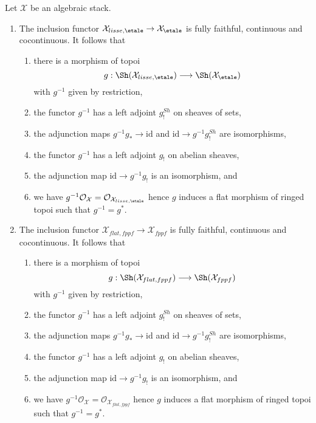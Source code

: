 \begin{lemma}
\label{lemma-lisse-etale}
Let $\mathcal{X}$ be an algebraic stack.
\begin{enumerate}
\item The inclusion functor
$\mathcal{X}_{lisse,\etale} \to \mathcal{X}_\etale$
is fully faithful, continuous and cocontinuous. It follows that
\begin{enumerate}
\item there is a morphism of topoi
$$
g :
\Sh(\mathcal{X}_{lisse,\etale})
\longrightarrow
\Sh(\mathcal{X}_\etale)
$$
with $g^{-1}$ given by restriction,
\item the functor $g^{-1}$ has a left adjoint $g_!^{Sh}$ on sheaves of sets,
\item the adjunction maps $g^{-1}g_* \to \text{id}$ and
$\text{id} \to g^{-1}g_!^{Sh}$ are isomorphisms,
\item the functor $g^{-1}$ has a left adjoint $g_!$ on abelian sheaves,
\item the adjunction map $\text{id} \to g^{-1}g_!$ is an isomorphism, and
\item we have $g^{-1}\mathcal{O}_\mathcal{X} =
\mathcal{O}_{\mathcal{X}_{lisse,\etale}}$ hence $g$ induces a flat
morphism of ringed topoi such that $g^{-1} = g^*$.
\end{enumerate}
\item The inclusion functor
$\mathcal{X}_{flat,fppf} \to \mathcal{X}_{fppf}$
is fully faithful, continuous and cocontinuous. It follows that
\begin{enumerate}
\item there is a morphism of topoi
$$
g :
\Sh(\mathcal{X}_{flat,fppf})
\longrightarrow
\Sh(\mathcal{X}_{fppf})
$$
with $g^{-1}$ given by restriction,
\item the functor $g^{-1}$ has a left adjoint $g_!^{Sh}$ on sheaves of sets,
\item the adjunction maps $g^{-1}g_* \to \text{id}$ and
$\text{id} \to g^{-1}g_!^{Sh}$ are isomorphisms,
\item the functor $g^{-1}$ has a left adjoint $g_!$ on abelian sheaves,
\item the adjunction map $\text{id} \to g^{-1}g_!$ is an isomorphism, and
\item we have $g^{-1}\mathcal{O}_\mathcal{X} =
\mathcal{O}_{\mathcal{X}_{flat,fppf}}$ hence $g$ induces a flat
morphism of ringed topoi such that $g^{-1} = g^*$.
\end{enumerate}
\end{enumerate}
\end{lemma}

